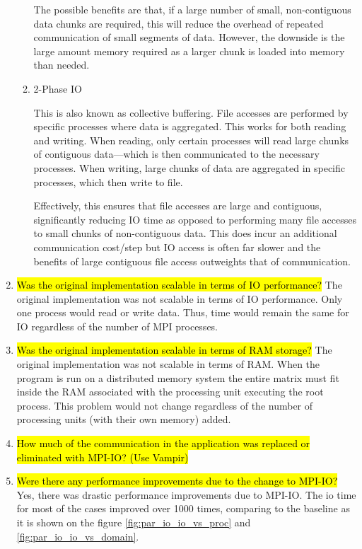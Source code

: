 \begin{enumerate}
\begin{enumerate}
	The possible benefits are that, if a large number of small, non-contiguous data chunks are required, this will reduce the overhead of repeated communication of small segments of data. However, the downside is the large amount memory required as a larger chunk is loaded into memory than needed.
	
	\item 2-Phase IO
	
	This is also known as collective buffering. File accesses are performed by specific processes where data is 
  aggregated. This works for both reading and writing. When reading, only certain processes will read large chunks of 
  contiguous data---which is then communicated to the necessary processes. When writing, large chunks of data are 
  aggregated in specific processes, which then write to file.
	
	Effectively, this ensures that file accesses are large and contiguous, significantly reducing IO time as opposed to performing many file accesses to small chunks of non-contiguous data. This does incur an additional communication cost/step but IO access is often far slower and the benefits of large contiguous file access outweights that of communication.
	\end{enumerate}

  \item \hl{Was the original implementation scalable in terms of IO performance?}
  The original implementation was not scalable in terms of IO performance. Only one process would read or write data. 
  Thus, time would remain the same for IO regardless of the number of MPI processes.
  
  \item \hl{Was the original implementation scalable in terms of RAM storage?}
  The original implementation was not scalable in terms of RAM. 
  When the program is run on a distributed memory system the entire matrix must fit inside the RAM associated with 
  the processing unit executing the root process. This problem would not change regardless of the number of 
  processing units (with their own memory) added.
  
  \item \hl{How much of the communication in the application was replaced or eliminated with MPI-IO? (Use
Vampir)}

  \item \hl{Were there any performance improvements due to the change to MPI-IO?}
  Yes, there was drastic performance improvements due to MPI-IO. The io time for most of the cases improved over 1000
  times, comparing to the baseline as it is shown on the figure \ref{fig:par_io_io_vs_proc} and 
  \ref{fig:par_io_io_vs_domain}.


\end{enumerate}
